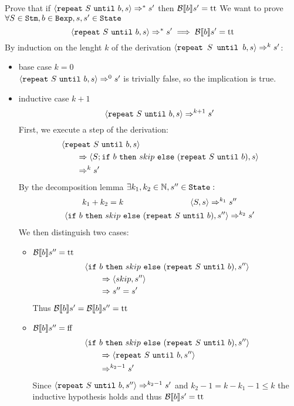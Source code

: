 \begin{exercise}{
    Prove that if $\left<\texttt{repeat}\ S\ \texttt{until}\ b, s\right> \Rightarrow^* s'$ then $\mathcal{B} \llbracket b \rrbracket s' = \text{tt}$ \vspace*{0.4cm}
}
    We want to prove $\forall S \in \texttt{Stm}, b \in \texttt{Bexp}, s, s' \in \texttt{State}$
    \[ \left<\texttt{repeat}\ S\ \texttt{until}\ b, s\right> \Rightarrow^* s' \implies \mathcal{B} \llbracket b \rrbracket s' = \text{tt} \]
    By induction on the lenght $k$ of the derivation $\left<\texttt{repeat } S \texttt{ until } b, s\right> \Rightarrow^k s'$:
    \begin{itemize}
        \item base case $k=0$ \\
            $\left<\texttt{repeat}\ S\ \texttt{until}\ b, s\right> \Rightarrow^0 s'$ is trivially false, so the implication is true.
        \item inductive case $k+1$
            \[ \left<\texttt{repeat}\ S\ \texttt{until}\ b, s\right> \Rightarrow^{k+1} s' \]
            First, we execute a step of the derivation:
            \begin{align*}
                &\left<\texttt{repeat}\ S\ \texttt{until}\ b, s\right>
                \\&\qquad \Rightarrow \left<S; \texttt{if}\ b\ \texttt{then}\ skip\ \texttt{else}\ (\texttt{repeat}\ S\ \texttt{until}\ b), s\right>
                \\&\qquad \Rightarrow^k s'
            \end{align*}
            By the decomposition lemma $\exists k_1, k_2 \in \mathbb{N}, s'' \in \texttt{State} :$
            \begin{gather*}
                k_1 + k_2 = k \qquad\qquad\qquad\qquad
                \left<S, s\right> \Rightarrow^{k_1} s'' \\
                \left<\texttt{if}\ b\ \texttt{then}\ skip\ \texttt{else}\ (\texttt{repeat}\ S\ \texttt{until}\ b), s''\right> \Rightarrow^{k_2} s'
            \end{gather*}
            We then distinguish two cases:
            \begin{itemize}
                \item $\mathcal{B} \llbracket b \rrbracket s'' = \text{tt}$
                    \begin{align*}
                        &\left<\texttt{if}\ b\ \texttt{then}\ skip\ \texttt{else}\ (\texttt{repeat}\ S\ \texttt{until}\ b), s''\right>
                        \\&\qquad \Rightarrow \left<skip, s''\right>
                        \\&\qquad \Rightarrow s'' = s'
                    \end{align*}
                    Thus $\mathcal{B} \llbracket b \rrbracket s' = \mathcal{B} \llbracket b \rrbracket s'' = \text{tt}$
                \item $\mathcal{B} \llbracket b \rrbracket s'' = \text{ff}$
                    \begin{align*}
                        &\left<\texttt{if}\ b\ \texttt{then}\ skip\ \texttt{else}\ (\texttt{repeat}\ S\ \texttt{until}\ b), s''\right>
                        \\&\qquad \Rightarrow \left<\texttt{repeat}\ S\ \texttt{until}\ b, s''\right>
                        \\&\qquad \Rightarrow^{k_2 - 1} s'
                    \end{align*}
                    Since $\left<\texttt{repeat}\ S\ \texttt{until}\ b, s''\right> \Rightarrow^{k_2 - 1} s'$ and $k_2 - 1 = k - k_1 - 1 \leq k$ the inductive hypothesis holds and thus $\mathcal{B} \llbracket b \rrbracket s' = \text{tt}$
            \end{itemize}
    \end{itemize}
\end{exercise}

